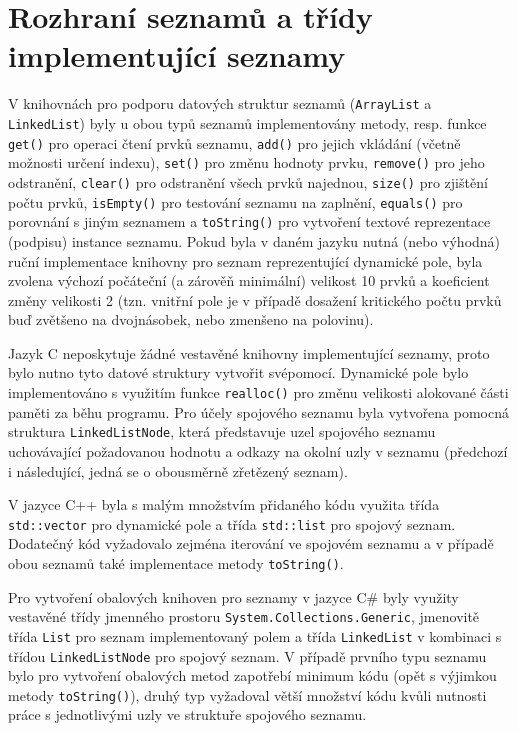 \documentclass[onepage, a4paper, 12pt]{bakalarka}
\begin{document}
\section{Rozhraní seznamů a třídy implementující seznamy}
V knihovnách pro podporu datových struktur seznamů (\texttt{ArrayList} a \texttt{LinkedList}) byly u obou typů seznamů implementovány metody, resp. funkce \texttt{get()} pro operaci čtení prvků seznamu, \texttt{add()} pro jejich vkládání (včetně možnosti určení indexu), \texttt{set()} pro změnu hodnoty prvku, \texttt{remove()} pro jeho odstranění, \texttt{clear()} pro odstranění všech prvků najednou, \texttt{size()} pro zjištění počtu prvků, \texttt{isEmpty()} pro testování seznamu na zaplnění, \texttt{equals()} pro porovnání s jiným seznamem a \texttt{toString()} pro vytvoření textové reprezentace (podpisu) instance seznamu. Pokud byla v daném jazyku nutná (nebo výhodná) ruční implementace knihovny pro seznam reprezentující dynamické pole, byla zvolena výchozí počáteční (a zárověň minimální) velikost 10 prvků a koeficient změny velikosti 2 (tzn. vnitřní pole je v případě dosažení kritického počtu prvků buď zvětšeno na dvojnásobek, nebo zmenšeno na polovinu).\par
Jazyk C neposkytuje žádné vestavěné knihovny implementující seznamy, proto bylo nutno tyto datové struktury vytvořit svépomocí. Dynamické pole bylo implementováno s využitím funkce \texttt{realloc()} pro změnu velikosti alokované části paměti za běhu programu. Pro účely spojového seznamu byla vytvořena pomocná struktura \texttt{LinkedListNode}, která představuje uzel spojového seznamu uchovávající požadovanou hodnotu a odkazy na okolní uzly v seznamu (předchozí i následující, jedná se o obousměrně zřetězený seznam).\par
V jazyce C++ byla s malým množstvím přidaného kódu využita třída \texttt{std::vector} pro dynamické pole a třída \texttt{std::list} pro spojový seznam. Dodatečný kód vyžadovalo zejména iterování ve spojovém seznamu a v případě obou seznamů také implementace metody \texttt{toString()}.\par
Pro vytvoření obalových knihoven pro seznamy v jazyce C\# byly využity vestavěné třídy jmenného prostoru \texttt{System.Collections.Generic}, jmenovitě třída \texttt{List} pro seznam implementovaný polem a třída \texttt{LinkedList} v kombinaci s třídou \texttt{LinkedListNode} pro spojový seznam. V případě prvního typu seznamu bylo pro vytvoření obalových metod zapotřebí minimum kódu (opět s výjimkou metody \texttt{toString()}), druhý typ vyžadoval větší množství kódu kvůli nutnosti práce s jednotlivými uzly ve struktuře spojového seznamu.\par
\end{document}
